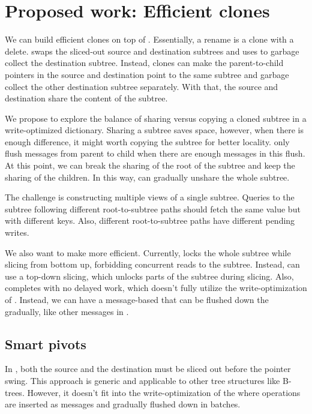 \section{Proposed work: Efficient clones}
\label{sec:clone}

We can build efficient clones on top of \rr.
Essentially, a rename is a clone with a delete.
\Rr swaps the sliced-out source and destination subtrees and uses \rd to
garbage collect the destination subtree.
Instead, clones can make the parent-to-child pointers in the source and
destination point to the same subtree and garbage collect the other destination
subtree separately.
With that, the source and destination share the content of the subtree.

We propose to explore the balance of sharing versus copying a cloned subtree
in a write-optimized dictionary.
Sharing a subtree saves space, however, when there is enough difference, it
might worth copying the subtree for better locality.
\bets only flush messages from parent to child when there are enough messages
in this flush.
At this point, we can break the sharing of the root of the subtree and keep
the sharing of the children.
In this way, \bets can gradually unshare the whole subtree.

The challenge is constructing multiple views of a single subtree.
Queries to the subtree following different root-to-subtree paths should fetch
the same value but with different keys.
Also, different root-to-subtree paths have different pending writes.

We also want to make \rr more efficient.
Currently, \rr locks the whole subtree while slicing from bottom up, forbidding
concurrent reads to the subtree.
Instead, \rr can use a top-down slicing, which unlocks parts of the subtree
during slicing.
Also, \rr completes with no delayed work, which doesn't fully utilize the
write-optimization of \bets.
Instead, we can have a message-based \rr that can be flushed down the \bet
gradually, like other messages in \bets.

\subsection{Smart pivots}

In \rr, both the source and the destination must be sliced out before the
pointer swing.
This approach is generic and applicable to other tree structures like B-trees.
However, it doesn't fit into the write-optimization of the \bet where
operations are inserted as messages and gradually flushed down in batches.

